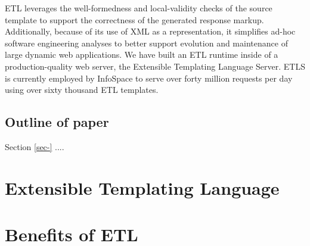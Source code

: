 \documentclass{www2003-submission}
\begin{document}
ETL leverages the well-formedness and local-validity checks of the
source template to support the correctness of the generated response
markup.  Additionally, because of its use of XML as a representation,
it simplifies ad-hoc software engineering analyses to better support
evolution and maintenance of large dynamic web applications.  We have
built an ETL runtime inside of a production-quality web server, the
Extensible Templating Language Server.  ETLS is currently employed by
InfoSpace to serve over forty million requests per day using over
sixty thousand ETL templates.

\subsection{Outline of paper}

Section \ref{sec-} ....







\section{Extensible Templating Language}




\section{Benefits of ETL}
\end{document}
